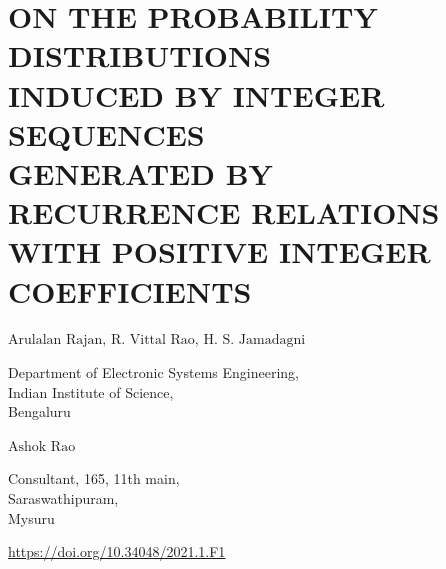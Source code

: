 \chapter{ON THE PROBABILITY DISTRIBUTIONS\\ INDUCED BY INTEGER SEQUENCES\\ GENERATED BY RECURRENCE RELATIONS\\ WITH POSITIVE INTEGER COEFFICIENTS}

\vskip 0.8cm

\begin{center}
{\large\uppercase{$\text{Arulalan Rajan, R. Vittal Rao, H. S. Jamadagni}$}} 

\vskip -6pt

Department of Electronic Systems Engineering,\\ Indian Institute of Science,\\ Bengaluru 

\end{center}


\begin{center}
{\large\uppercase{$\text{Ashok Rao}$}} 

\vskip -6pt

Consultant, 165, 11th main,\\ Saraswathipuram,\\ Mysuru

\end{center}

\centerline{\url{https://doi.org/10.34048/2021.1.F1}}

\vfill






\newpage



